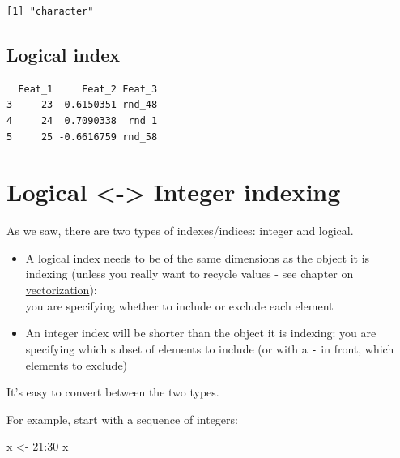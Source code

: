 \documentclass[
]{book}
\newenvironment{Shaded}{\begin{snugshade}}{\end{snugshade}}
\newcommand{\DecValTok}[1]{\textcolor[rgb]{0.00,0.00,0.81}{#1}}
\newcommand{\NormalTok}[1]{#1}
\newcommand{\OtherTok}[1]{\textcolor[rgb]{0.56,0.35,0.01}{#1}}
\newcommand{\SpecialCharTok}[1]{\textcolor[rgb]{0.00,0.00,0.00}{#1}}
\begin{document}
\begin{verbatim}
[1] "character"
\end{verbatim}

\hypertarget{dfidl}{%
\subsection{Logical index}\label{dfidl}}

\begin{Shaded}
\end{Shaded}

\begin{verbatim}
  Feat_1     Feat_2 Feat_3
3     23  0.6150351 rnd_48
4     24  0.7090338  rnd_1
5     25 -0.6616759 rnd_58
\end{verbatim}

\hypertarget{logical---integer-indexing}{%
\section{Logical \textless-\textgreater{} Integer indexing}\label{logical---integer-indexing}}

As we saw, there are two types of indexes/indices: integer and logical.

\begin{rmdnote}
\begin{itemize}
\item
  A logical index needs to be of the same dimensions as the object it is
  indexing (unless you really want to recycle values - see chapter on
  \protect\hyperlink{vectorization}{vectorization}):\\
  you are specifying whether to include or exclude each element
\item
  An integer index will be shorter than the object it is indexing: you
  are specifying which subset of elements to include (or with a
  \texttt{-} in front, which elements to exclude)
\end{itemize}
\end{rmdnote}

It's easy to convert between the two types.

For example, start with a sequence of integers:

\begin{Shaded}
\begin{Highlighting}[]
\NormalTok{x }\OtherTok{\textless{}{-}} \DecValTok{21}\SpecialCharTok{:}\DecValTok{30}
\NormalTok{x}
\end{Highlighting}
\end{Shaded}
\end{document}
